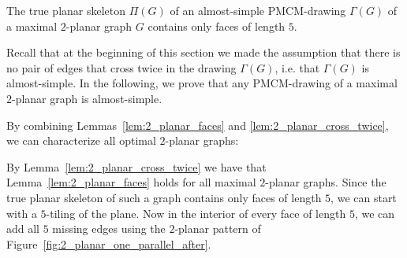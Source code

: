  \begin{corollary}\label{cor:2_planar_faces}
  The true planar skeleton $\Pi(G)$ of an almost-simple PMCM-drawing $\Gamma(G)$ of a maximal $2$-planar graph $G$ contains only faces of length $5$.
 \end{corollary}

Recall that at the beginning of this section we made the assumption that there is no pair of edges that cross twice in the drawing $\Gamma(G)$, i.e. that $\Gamma(G)$ is almost-simple. In the following, we prove that any PMCM-drawing of a maximal $2$-planar graph is almost-simple.



%

By combining Lemmas~\ref{lem:2_planar_faces} and \ref{lem:2_planar_cross_twice}, we can characterize all optimal $2$-planar graphs:


 By Lemma~\ref{lem:2_planar_cross_twice} we have that Lemma~\ref{lem:2_planar_faces} holds for all maximal $2$-planar graphs. Since the true planar skeleton of such a graph contains only faces of length $5$, we can start with a $5$-tiling of the plane. Now in the interior of every face of length $5$, we can add all  $5$ missing edges using the $2$-planar pattern of Figure~\ref{fig:2_planar_one_parallel_after}.

